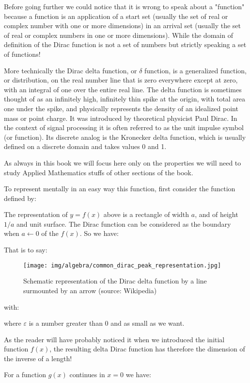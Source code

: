 	Before going further we could notice that it is wrong to speak about a "function" because a function is an application of a start set (usually the set of real or complex number with one or more dimensions) in an arrival set (usually the set of real or complex numbers in one or more dimensions). While the domain of definition of the Dirac function is not a set of numbers but strictly speaking a set of functions!
	
	More technically the Dirac delta function, or $\delta$ function, is a generalized function, or distribution, on the real number line that is zero everywhere except at zero, with an integral of one over the entire real line. The delta function is sometimes thought of as an infinitely high, infinitely thin spike at the origin, with total area one under the spike, and physically represents the density of an idealized point mass or point charge. It was introduced by theoretical physicist Paul Dirac. In the context of signal processing it is often referred to as the unit impulse symbol (or function). Its discrete analog is the Kronecker delta function, which is usually defined on a discrete domain and takes values 0 and 1.
	
	As always in this book we will focus here only on the properties we will need to study Applied Mathematics stuffs of other sections of the book.
	
	To represent mentally in an easy way this function, first consider the function defined by:
	
	The representation of $y=f(x)$ above is a rectangle of width $a$, and of height $1/ a$ and unit surface. The Dirac function can be considered as the boundary when $a\leftarrow 0$ of the  $f (x)$. So we have:		
	
	That is to say:
	\begin{figure}[H]
		\centering
		\texttt{[image: img/algebra/common\_dirac\_peak\_representation.jpg]}
		\caption[Schematic representation of the Dirac delta function by a line surmounted by an arrow]{Schematic representation of the Dirac delta function by a line surmounted by an arrow (source: Wikipedia)}
	\end{figure}
	with:
	
	where $\varepsilon$ is a number greater than $0$ and as small as we want.
	\begin{tcolorbox}[title=Remark,colframe=black,arc=10pt]
		As the reader will have probably noticed it when we introduced the initial function $f (x)$, the resulting delta Dirac function has therefore the dimension of the inverse of a length!
	\end{tcolorbox}
	For a function $g (x)$ continues in $x = 0$ we have:
	
